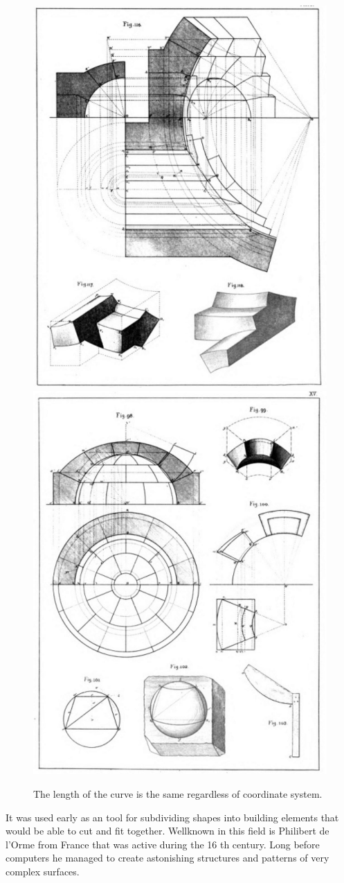 \begin{figure}[H]
\centering
\includegraphics[width=0.45\linewidth ]{figure/Introduction/NotesonStereotomy.JPG}
\includegraphics[width=0.45\linewidth ]{figure/Introduction/NotesonStereotomy2.JPG}
\caption{The length of the curve is the same regardless of coordinate system.}
\end{figure}

It was used early as an tool for subdividing shapes into building elements that would be able to cut and fit together. Wellknown in this field is Philibert de l'Orme from France that was active during the 16 th century. Long before computers he managed to create astonishing structures and patterns of very complex surfaces.

